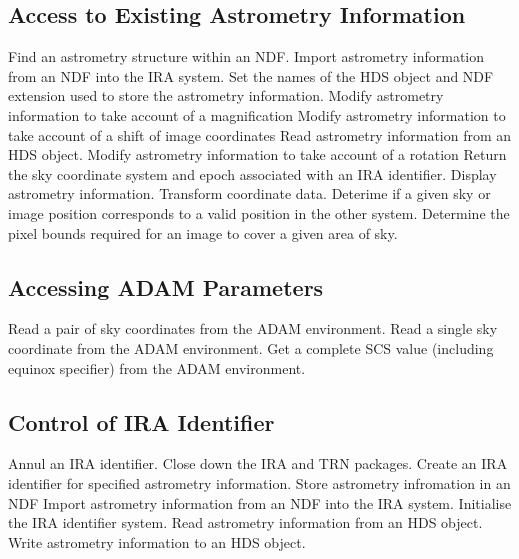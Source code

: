 \subsection {Access to Existing Astrometry Information}
   {Find an astrometry structure within an NDF.}
   {Import astrometry information from an NDF into the IRA system.}
   {Set the names of the HDS object and NDF extension used to store the 
   astrometry information.}
   {Modify astrometry information to take account of a magnification}
   {Modify astrometry information to take account of a shift of image 
coordinates}
   {Read astrometry information from an HDS object.}
   {Modify astrometry information to take account of a rotation}
   {Return the sky coordinate system and epoch associated with an IRA 
    identifier.}
   {Display astrometry information.}
   {Transform coordinate data.}
   {Deterime if a given sky or image position corresponds to a valid position
    in the other system.}
   {Determine the pixel bounds required for an image to cover a given area of 
    sky.}

\subsection {Accessing ADAM Parameters}
\label {APP:ADAM}
   {Read a pair of sky coordinates from the ADAM environment.}
   {Read a single sky coordinate from the ADAM environment.}
   {Get a complete SCS value (including equinox specifier) from the ADAM 
    environment.}

\subsection {Control of IRA Identifier}
   {Annul an IRA identifier.}
   {Close down the IRA and TRN packages.}
   {Create an IRA identifier for specified astrometry information.}
   {Store astrometry infromation in an NDF}
   {Import astrometry information from an NDF into the IRA system.}
   {Initialise the IRA identifier system.}
   {Read astrometry information from an HDS object.}
   {Write astrometry information to an HDS object.}

